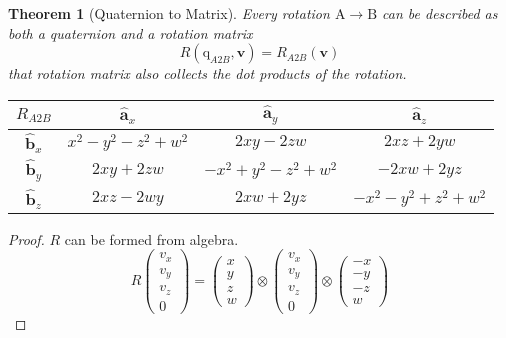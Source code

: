 \documentclass{amsart}
\newtheorem{theorem}{Theorem}[section]
\theoremstyle{definition}
\theoremstyle{remark}
\numberwithin{equation}{section}
\begin{document}
\begin{theorem}[Quaternion to Matrix]
  Every rotation $\mathrm{A}\to\mathrm{B}$ can be described as both a quaternion and a rotation matrix
  \begin{equation}
    R(\mathrm{q}_{A2B}, \mathbf{v}) = R_{A2B}\left(\mathbf{v}\right)
  \end{equation}
  that rotation matrix also collects the dot products of the rotation.
  
  \begin{tabular}{c|ccc}
    $R_{A2B}$ & $\hat{\mathbf{a}}_x$ & $\hat{\mathbf{a}}_y$ & $\hat{\mathbf{a}}_z$ \\
    \hline
    $\hat{\mathbf{b}}_x$ & $x^2-y^2-z^2+w^2$ & $2xy-2zw$ & $2xz+2yw$ \\
    $\hat{\mathbf{b}}_y$ & $2xy+2zw$ & $-x^2+y^2-z^2+w^2$ & $-2xw+2yz$ \\
    $\hat{\mathbf{b}}_z$ & $2xz-2wy$ & $2xw+2yz$ & $-x^2-y^2+z^2+w^2$
  \end{tabular}\centering
\end{theorem}
\begin{proof}
  $R$ can be formed from algebra.
  \begin{equation}
    R
    \begin{pmatrix}
      v_x \\
      v_y \\
      v_z \\
      0
    \end{pmatrix}
    =
    \begin{pmatrix}
      x \\
      y \\
      z \\
      w
    \end{pmatrix} \otimes
    \begin{pmatrix}
      v_x \\
      v_y \\
      v_z \\
      0
    \end{pmatrix}
    \otimes
    \begin{pmatrix}
      -x \\
      -y \\
      -z \\
      w
    \end{pmatrix}
  \end{equation}
\end{proof}
\end{document}
